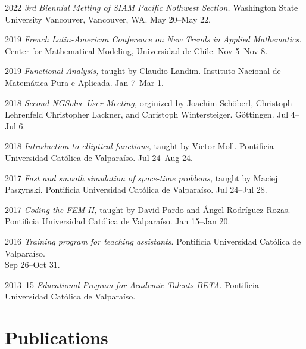 \documentclass[12pt,letterpaper]{report}
\begin{document}
    \begin{tablist}

	\item[2022] \tab \emph{3rd Biennial Metting of SIAM Pacific Nothwest Section.} Washington State University Vancouver, Vancouver, WA. May 20--May 22.

        \item[2019] \tab \emph{French Latin-American Conference on New Trends in Applied Mathematics.} Center for Mathematical Modeling, Universidad de Chile. Nov 5--Nov 8.

        \item[2019] \tab \emph{Functional Analysis,} taught by Claudio Landim. Instituto Nacional de Matem\'atica Pura e Aplicada. Jan 7--Mar 1.
        
        \item[2018] \tab \emph{Second NGSolve User Meeting,} orginized by Joachim Schöberl, Christoph Lehrenfeld
        Christopher Lackner, and Christoph Wintersteiger. Göttingen. Jul 4--Jul 6. 

        \item[2018] \tab \emph{Introduction to elliptical functions,} taught by Victor Moll. Pontificia Universidad Cat\'olica de Valpara\'iso. Jul 24--Aug 24.
        
        \item[2017] \tab \emph{Fast and smooth simulation of space-time problems,} taught by Maciej Paszynski. Pontificia Universidad Cat\'olica de Valpara\'iso. Jul 24--Jul 28.
        
        \item[2017] \tab \emph{Coding the FEM II,} taught by David Pardo and \'Angel Rodr\'iguez-Rozas. Pontificia Universidad Cat\'olica de Valpara\'iso. Jan 15--Jan 20. 

        \item[2016]  \tab \emph{Training program for teaching assistants}. Pontificia Universidad Cat\'olica de Valpara\'iso.\\ Sep 26--Oct 31.
        
        \item[2013--15] \tab \emph{Educational Program for Academic Talents BETA}. Pontificia Universidad Cat\'olica de Valpara\'iso.

    \end{tablist}

    \section*{Publications}
\end{document}
